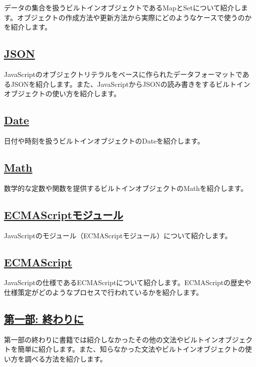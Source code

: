 データの集合を扱うビルトインオブジェクトであるMapとSetについて紹介します。オブジェクトの作成方法や更新方法から実際にどのようなケースで使うのかを紹介します。

\hypertarget{json}{%
\subsection*{\texorpdfstring{\href{./json/README.md}{JSON}}{JSON}}\label{json}}

JavaScriptのオブジェクトリテラルをベースに作られたデータフォーマットであるJSONを紹介します。また、JavaScriptからJSONの読み書きをするビルトインオブジェクトの使い方を紹介します。

\hypertarget{date}{%
\subsection*{\texorpdfstring{\href{./date/README.md}{Date}}{Date}}\label{date}}

日付や時刻を扱うビルトインオブジェクトのDateを紹介します。

\hypertarget{math}{%
\subsection*{\texorpdfstring{\href{./math/README.md}{Math}}{Math}}\label{math}}

数学的な定数や関数を提供するビルトインオブジェクトのMathを紹介します。

\hypertarget{module}{%
\subsection*{\texorpdfstring{\href{./module/README.md}{ECMAScriptモジュール}}{ECMAScriptモジュール}}\label{module}}

JavaScriptのモジュール（ECMAScriptモジュール）について紹介します。

\hypertarget{ecmascript}{%
\subsection*{\texorpdfstring{\href{./ecmascript/README.md}{ECMAScript}}{ECMAScript}}\label{ecmascript}}

JavaScriptの仕様であるECMAScriptについて紹介します。ECMAScriptの歴史や仕様策定がどのようなプロセスで行われているかを紹介します。

\hypertarget{other-parts}{%
\subsection*{\texorpdfstring{\href{./other-parts/README.md}{第一部:
終わりに}}{第一部: 終わりに}}\label{other-parts}}

第一部の終わりに書籍では紹介しなかったその他の文法やビルトインオブジェクトを簡単に紹介します。また、知らなかった文法やビルトインオブジェクトの使い方を調べる方法を紹介します。
